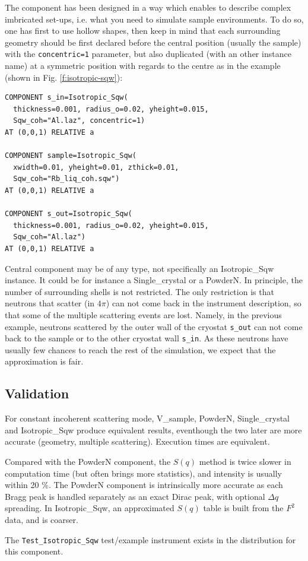 The component has been designed in a way which enables to describe complex imbricated set-ups, i.e. what you need to simulate sample environments. To do so, one has first to use hollow shapes, then keep in mind that each surrounding geometry should be first declared before the central position (usually the sample) with the \verb+concentric=1+ parameter, but also duplicated (with an other instance name) at a symmetric position with regards to the centre as in the example (shown in Fig. \ref{f:isotropic-sqw}):
\begin{verbatim}
COMPONENT s_in=Isotropic_Sqw(
  thickness=0.001, radius_o=0.02, yheight=0.015,
  Sqw_coh="Al.laz", concentric=1)
AT (0,0,1) RELATIVE a

COMPONENT sample=Isotropic_Sqw(
  xwidth=0.01, yheight=0.01, zthick=0.01,
  Sqw_coh="Rb_liq_coh.sqw")
AT (0,0,1) RELATIVE a

COMPONENT s_out=Isotropic_Sqw(
  thickness=0.001, radius_o=0.02, yheight=0.015,
  Sqw_coh="Al.laz")
AT (0,0,1) RELATIVE a
\end{verbatim}
Central component may be of any type, not specifically an Isotropic\_Sqw instance. It could be for instance a Single\_crystal or a PowderN.
In principle, the number of surrounding shells is not restricted.
The only restriction is that neutrons that scatter (in $4\pi$) can not come back in the instrument description, so that some of the multiple scattering events are lost. Namely, in the previous example, neutrons scattered by the outer wall of the cryostat \verb+s_out+ can not come back to the sample or to the other cryostat wall \verb+s_in+. As these neutrons have usually few chances to reach the rest of the simulation, we expect that the approximation is fair.

\subsection{Validation}
For constant incoherent scattering mode, V\_sample, PowderN, Single\_crystal and Isotropic\_Sqw produce equivalent results, eventhough the two later are more accurate (geometry, multiple scattering). Execution times are equivalent.

Compared with the PowderN component, the $S(q)$ method is twice slower in computation time (but often brings more statistics), and intensity is usually within 20 \%. The PowderN component is intrinsically more accurate as each Bragg peak is handled separately as an exact Dirac peak, with optional $\Delta q$ spreading. In Isotropic\_Sqw, an approximated $S(q)$ table is built from the $F^2$ data, and is coarser.

The \verb+Test_Isotropic_Sqw+ test/example instrument exists in the distribution for this component.



